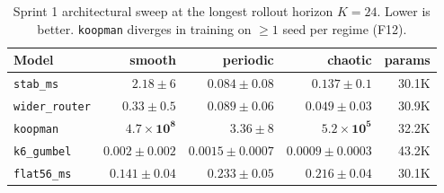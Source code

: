\documentclass[11pt,a4paper]{article}
\begin{document}
\begin{table}[h]
\centering
\caption{Sprint 1 architectural sweep at the longest rollout horizon
$K{=}24$. Lower is better. \texttt{koopman} diverges in training on
$\geq 1$ seed per regime (F12).}
\label{tab:sprint1-summary}
\begin{tabular}{lrrrr}
\toprule
Model & smooth & periodic & chaotic & params \\
\midrule
\texttt{stab\_ms}     & $2.18 \pm 6$        & $0.084 \pm 0.08$    & $0.137 \pm 0.1$     & 30.1K \\
\texttt{wider\_router}& $0.33 \pm 0.5$      & $0.089 \pm 0.06$    & $\bm{0.049 \pm 0.03}$ & 30.9K \\
\texttt{koopman}      & $\bm{4.7{\times}10^{8}}$ & $3.36 \pm 8$    & $\bm{5.2{\times}10^{5}}$ & 32.2K \\
\texttt{k6\_gumbel}   & $\bm{0.002 \pm 0.002}$ & $\bm{0.0015 \pm 0.0007}$ & $\bm{0.0009 \pm 0.0003}$ & 43.2K \\
\texttt{flat56\_ms}   & $0.141 \pm 0.04$    & $0.233 \pm 0.05$    & $0.216 \pm 0.04$    & 30.1K \\
\bottomrule
\end{tabular}
\end{table}
\end{document}
